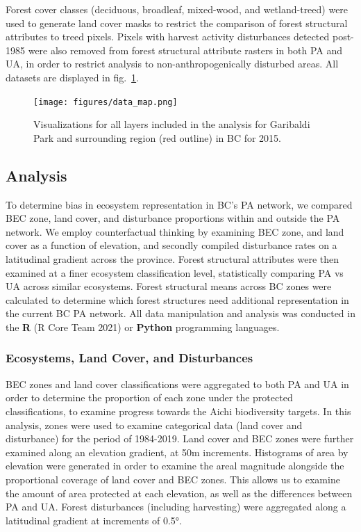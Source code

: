 \documentclass[11pt]{article}
\begin{document}
Forest cover classes (deciduous, broadleaf, mixed-wood, and
wetland-treed) were used to generate land cover masks to restrict the
comparison of forest structural attributes to treed pixels. Pixels with
harvest activity disturbances detected post-1985 were also removed from
forest structural attribute rasters in both PA and UA, in order to
restrict analysis to non-anthropogenically disturbed areas. All datasets
are displayed in fig.~\ref{fig:data-fig}.

\begin{figure}
\hypertarget{fig:data-fig}{%
\centering
\texttt{[image: figures/data\_map.png]}
\caption{Visualizations for all layers included in the analysis for
Garibaldi Park and surrounding region (red outline) in BC for
2015.}\label{fig:data-fig}
}
\end{figure}

\hypertarget{analysis}{%
\subsection{Analysis}\label{analysis}}

To determine bias in ecosystem representation in BC's PA network, we
compared BEC zone, land cover, and disturbance proportions within and
outside the PA network. We employ counterfactual thinking by examining
BEC zone, and land cover as a function of elevation, and secondly
compiled disturbance rates on a latitudinal gradient across the
province. Forest structural attributes were then examined at a finer
ecosystem classification level, statistically comparing PA vs UA across
similar ecosystems. Forest structural means across BC zones were
calculated to determine which forest structures need additional
representation in the current BC PA network. All data manipulation and
analysis was conducted in the \textbf{R} (R Core Team 2021) or
\textbf{Python} programming languages.

\hypertarget{ecosystems-land-cover-and-disturbances}{%
\subsubsection{Ecosystems, Land Cover, and
Disturbances}\label{ecosystems-land-cover-and-disturbances}}

BEC zones and land cover classifications were aggregated to both PA and
UA in order to determine the proportion of each zone under the protected
classifications, to examine progress towards the Aichi biodiversity
targets. In this analysis, zones were used to examine categorical data
(land cover and disturbance) for the period of 1984-2019. Land cover and
BEC zones were further examined along an elevation gradient, at 50m
increments. Histograms of area by elevation were generated in order to
examine the areal magnitude alongside the proportional coverage of land
cover and BEC zones. This allows us to examine the amount of area
protected at each elevation, as well as the differences between PA and
UA. Forest disturbances (including harvesting) were aggregated along a
latitudinal gradient at increments of 0.5°.
\end{document}
